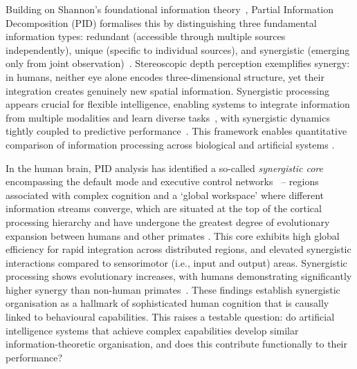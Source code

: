 \documentclass[11pt,a4paper]{ouparticle}
\begin{document}
Building on Shannon's foundational information theory~\cite{shannon_1948}, Partial Information Decomposition (PID) formalises this by distinguishing three fundamental information types: redundant (accessible through multiple sources independently), unique (specific to individual sources), and synergistic (emerging only from joint observation)~\cite{pid2010beer}. Stereoscopic depth perception exemplifies synergy: in humans, neither eye alone encodes three-dimensional structure, yet their integration creates genuinely new spatial information. Synergistic processing appears crucial for flexible intelligence, enabling systems to integrate information from multiple modalities and learn diverse tasks~\cite{proca2024}, with synergistic dynamics tightly coupled to predictive performance~\cite{tolle2024evolving}. This framework enables quantitative comparison of information processing across biological and artificial systems \cite{Tax2017,ehrlich2023complexity}.

In the human brain, PID analysis has identified a so-called \textit{synergistic core} encompassing the default mode and executive control networks~\cite{luppi2022synergistic} -- regions associated with complex cognition and a `global workspace' where different information streams converge, which are situated at the top of the cortical processing hierarchy and have undergone the greatest degree of evolutionary expansion between humans and other primates \cite{baars1993,dehaene2001workspace,luppi2024workspace,luppi2022synergistic,wei2019genetic,varley2023partial}. This core exhibits high global efficiency for rapid integration across distributed regions, and elevated synergistic interactions compared to sensorimotor (i.e., input and output) areas. Synergistic processing shows evolutionary increases, with humans demonstrating significantly higher synergy than non-human primates~\cite{luppi2022synergistic}. These findings establish synergistic organisation as a hallmark of sophisticated human cognition that is causally linked to behavioural capabilities. This raises a testable question: do artificial intelligence systems that achieve complex capabilities develop similar information-theoretic organisation, and does this contribute functionally to their performance?
\end{document}
